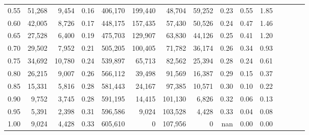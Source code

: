 \begin{tabular}{rrrcrrrrrrrrrrr}
0.55 &  51,268 &   9,454 &                                       0.16 &  406,170 &  199,440 &   48,704 &   59,252 &  0.23 &  0.55 &                         1.85 \\
0.60 &  42,005 &   8,726 &                                       0.17 &  448,175 &  157,435 &   57,430 &   50,526 &  0.24 &  0.47 &                         1.46 \\
0.65 &  27,528 &   6,400 &                                       0.19 &  475,703 &  129,907 &   63,830 &   44,126 &  0.25 &  0.41 &                         1.20 \\
0.70 &  29,502 &   7,952 &                                       0.21 &  505,205 &  100,405 &   71,782 &   36,174 &  0.26 &  0.34 &                         0.93 \\
0.75 &  34,692 &  10,780 &                                       0.24 &  539,897 &   65,713 &   82,562 &   25,394 &  0.28 &  0.24 &                         0.61 \\
0.80 &  26,215 &   9,007 &                                       0.26 &  566,112 &   39,498 &   91,569 &   16,387 &  0.29 &  0.15 &                         0.37 \\
0.85 &  15,331 &   5,816 &                                       0.28 &  581,443 &   24,167 &   97,385 &   10,571 &  0.30 &  0.10 &                         0.22 \\
0.90 &   9,752 &   3,745 &                                       0.28 &  591,195 &   14,415 &  101,130 &    6,826 &  0.32 &  0.06 &                         0.13 \\
0.95 &   5,391 &   2,398 &                                       0.31 &  596,586 &    9,024 &  103,528 &    4,428 &  0.33 &  0.04 &                         0.08 \\
1.00 &   9,024 &   4,428 &                                       0.33 &  605,610 &        0 &  107,956 &        0 &   nan &  0.00 &                         0.00 \\
\bottomrule
\end{tabular}

